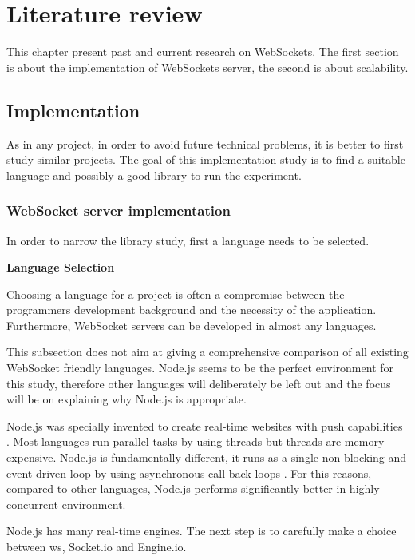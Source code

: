 \chapter{Literature review} 
\label{Chapter2} 

This chapter present past and current research on WebSockets. The first
section is about the implementation of WebSockets server, the second is about
scalability. 

\section{Implementation}

As in any project, in order to avoid future technical problems, it is better to
first study similar projects. The goal of this implementation study is to find a
suitable language and possibly a good library to run the experiment.

\subsection{WebSocket server implementation}

In order to narrow the library study, first a language needs to be selected.

\textbf{Language Selection}

Choosing a language for a project is often a compromise between the programmers
development background and the necessity of the application. Furthermore,
WebSocket servers can be developed in almost any languages.

This subsection does not aim at giving a comprehensive comparison of all
existing WebSocket friendly languages. Node.js seems to be the perfect
environment for this study, therefore other languages will deliberately be left
out and the focus will be on explaining why Node.js is appropriate.

Node.js was specially invented to create real-time websites with push
capabilities \citep{Reference35}. Most languages run parallel tasks by using
threads but threads are memory expensive. Node.js is fundamentally different,
it runs as a single non-blocking and event-driven loop by using asynchronous
call back loops \citep{Reference37}. For this reasons, compared to other
languages, Node.js performs significantly better in highly concurrent
environment.

Node.js has many real-time engines. The next step is to carefully make a choice
between ws, Socket.io and Engine.io.  

